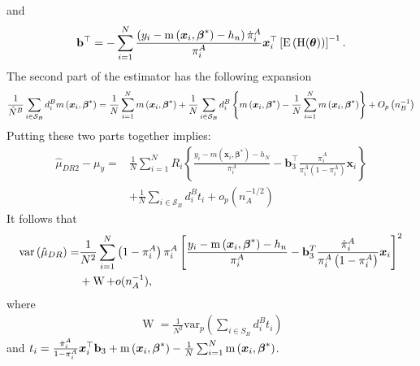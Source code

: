 \documentclass[
  letterpaper,
  DIV=11,
  numbers=noendperiod]{scrreprt}
\begin{document}
and \[
\mathbf{b}^{\top} = -\sum_{i=1}^N \frac{\left(y_i - \operatorname{m}\left(\boldsymbol{x}_i,\boldsymbol{\beta}^*\right) - h_n\right)\dot{\pi}_i^A}{\pi_i^A}\boldsymbol{x}_i^{\top}\left[\operatorname{E}\left(\operatorname{H}(\boldsymbol{\theta})\right)\right]^{-1}.
\] The second part of the estimator has the following expansion \[
\begin{equation} \label{eq2}
\frac{1}{\hat{N}^B} \sum_{i \in \mathcal{S}_B} d_i^B m\left(\bx_i,\bbeta^*\right)=\frac{1}{N} \sum_{i=1}^N m\left(\bx_i,\bbeta^*\right)+\frac{1}{N} \sum_{i \in \mathcal{S}_B} d_i^B\left\{m\left(\bx_i,\bbeta^*\right)-\frac{1}{N} \sum_{i=1}^N m\left(\bx_i,\bbeta^*\right)\right\}+O_p\left(n_B^{-1}\right)
\end{equation}
\] Putting these two parts together implies: \[
\begin{equation}
\begin{aligned}
\hat{\mu}_{D R 2}-\mu_y = & \frac{1}{N} \sum_{i=1}^N R_i\left\{\frac{y_i-m\left(\boldsymbol{x}_i, \boldsymbol{\beta}^*\right)-h_N}{\pi_i^A}-\mathbf{b}_3^{\top} \frac{\dot{\pi}_i^A}{\pi_i^A \left(1 - \pi_i^A \right)} \boldsymbol{x}_i\right\} \\
& +\frac{1}{N} \sum_{i \in \mathcal{S}_B} d_i^B t_i +o_p\left(n_A^{-1 / 2}\right)
\end{aligned}
\end{equation}
\] It follows that \[
\begin{equation*}
    \begin{aligned}
        \text{var}\left(\hat{\mu}_{DR}\right) = & \frac{1}{N^2} \sum_{i=1}^N \left(1 - \pi_i^A\right)\pi_i^A \left[\frac{y_i - \operatorname{m}\left(\bx_i,\bbeta^*\right) - h_n}{\pi_i^A} - \mathbf{b}_3^T\frac{\dot{\pi}_i^A}{\pi_i^A \left(1 - \pi_i^A \right)}\bx_i\right]^2 \\ & + \operatorname{W} + o(n_A^{-1}),
    \end{aligned}
\end{equation*}
\] where \[
\begin{align}
    \operatorname{W} = \frac{1}{N^2}\text{var}_p\left(\sum_{i \in S_B} d_i^B t_i\right)
\end{align}
\] and
\(t_i = \frac{\dot{\pi}_i^A}{1 - \pi_i^A} \boldsymbol{x}_i^{\top} \mathbf{b}_3 + \operatorname{m}\left(\boldsymbol{x}_i,\boldsymbol{\beta}^*\right)- \frac{1}{N} \sum_{i=1}^N \operatorname{m}\left(\boldsymbol{x}_i,\boldsymbol{\beta}^*\right)\).
\end{document}
